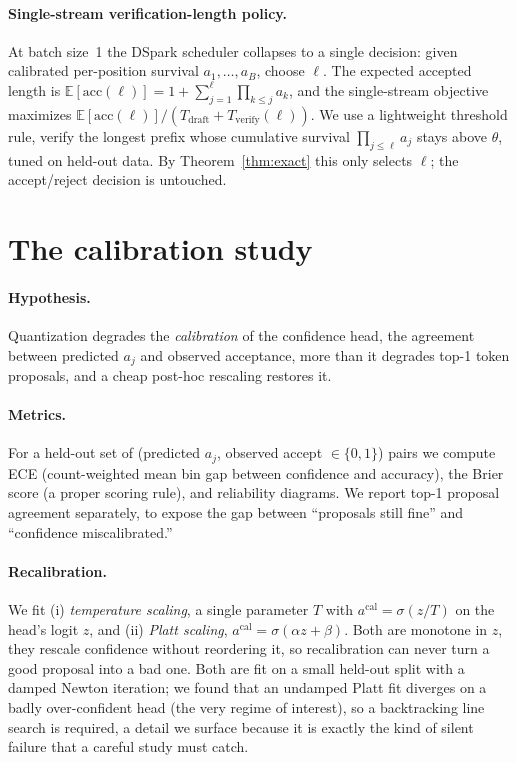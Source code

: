 \documentclass[11pt]{article}
\theoremstyle{plain}
\theoremstyle{definition}
\begin{document}
\paragraph{Single-stream verification-length policy.}
At batch size~1 the DSpark scheduler collapses to a single decision: given
calibrated per-position survival $a_1,\dots,a_B$, choose $\ell$. The expected
accepted length is
$\mathbb{E}[\text{acc}(\ell)] = 1 + \sum_{j=1}^{\ell}\prod_{k\le j}a_k$, and the
single-stream objective maximizes
$\mathbb{E}[\text{acc}(\ell)] / (T_\text{draft}+T_\text{verify}(\ell))$. We use a
lightweight threshold rule, verify the longest prefix whose cumulative survival
$\prod_{j\le\ell}a_j$ stays above $\theta$, tuned on held-out data. By
Theorem~\ref{thm:exact} this only selects $\ell$; the accept/reject decision is
untouched.

\section{The calibration study}
\label{sec:calibration}
\paragraph{Hypothesis.} Quantization degrades the \emph{calibration} of the
confidence head, the agreement between predicted $a_j$ and observed
acceptance, more than it degrades top-1 token proposals, and a cheap post-hoc
rescaling restores it.

\paragraph{Metrics.} For a held-out set of (predicted $a_j$, observed accept
$\in\{0,1\}$) pairs we compute ECE (count-weighted mean bin gap between confidence
and accuracy), the Brier score (a proper scoring rule), and reliability diagrams.
We report top-1 proposal agreement separately, to expose the gap between
``proposals still fine'' and ``confidence miscalibrated.''

\paragraph{Recalibration.} We fit (i) \emph{temperature scaling}, a single
parameter $T$ with $a^\text{cal}=\sigma(z/T)$ on the head's logit $z$, and (ii)
\emph{Platt scaling}, $a^\text{cal}=\sigma(\alpha z+\beta)$. Both are monotone in
$z$, they rescale confidence without reordering it, so recalibration can never
turn a good proposal into a bad one. Both are fit on a small held-out split with a
damped Newton iteration; we found that an undamped Platt fit diverges on a badly
over-confident head (the very regime of interest), so a backtracking line search
is required, a detail we surface because it is exactly the kind of silent failure
that a careful study must catch.
\end{document}
